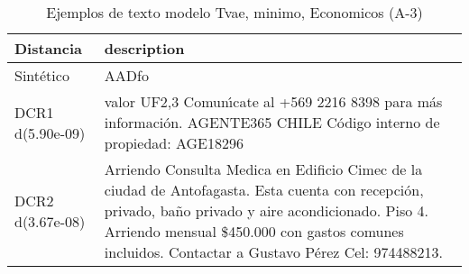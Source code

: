 \begin{table}[H]
\centering
\fontsize{10}{14}\selectfont
\caption{Ejemplos de texto modelo Tvae, minimo, Economicos (A-3)}
\label{table-example-economicos-a-3-tvae-min-text}
\begin{tabular}{|l|m{35em}|}
\hline
\rowcolor[gray]{0.8}
Distancia & description \\
\hline Sintético & AADfo \\
\hline DCR1 d(5.90e-09) & valor UF2,3 Comun{\'\i}cate al +569 2216 8398 para m\'as informaci\'on. AGENTE365 CHILE C\'odigo interno de propiedad: AGE18296 \\
\hline DCR2 d(3.67e-08) & Arriendo Consulta Medica en Edificio Cimec de la ciudad de Antofagasta. Esta cuenta con recepci\'on, privado, ba\~no privado y aire acondicionado. Piso 4. Arriendo mensual \$450.000 con gastos comunes incluidos.
Contactar a Gustavo P\'erez Cel: 974488213. \\
\hline
\end{tabular}
\end{table}
